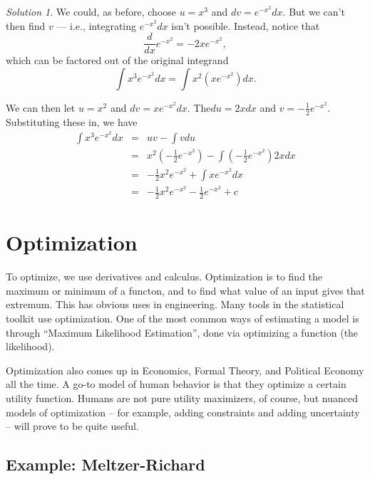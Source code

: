 \documentclass[
]{book}
\theoremstyle{definition}
\theoremstyle{definition}
\theoremstyle{definition}
\theoremstyle{definition}
\theoremstyle{remark}
\newtheorem*{solution}{Solution}
\begin{document}
\begin{solution}
{}We could, as before, choose \(u=x^3\) and \(dv=e^{-x^2}dx\). But we can't then find \(v\) --- i.e., integrating \(e^{-x^2}dx\) isn't possible. Instead, notice that \[\frac{d}{dx}e^{-x^2} = -2xe^{-x^2},\] which can be factored out of the original integrand \[\int x^3 e^{-x^2} dx = \int x^2 (xe^{-x^2})dx.\]

We can then let \(u=x^2\) and \(dv=x e^{-x^2}dx\). The\(du=2x dx\) and \(v=-\frac{1}{2}e^{-x^2}\). Substituting these in, we have
\begin{eqnarray}
                \int x^3 e^{-x^2} dx &=& u v - \int v du\nonumber\\
                &=& x^2 \left( -\frac{1}{2}e^{-x^2}\right) -\int \left(-\frac{1}{2}e^{-x^2}\right)2x dx\nonumber\\
                &=& -\frac{1}{2}x^2 e^{-x^2}+\int x e^{-x^2}dx\nonumber\\
                &=& -\frac{1}{2}x^2 e^{-x^2}-\frac{1}{2}e^{-x^2}+c\nonumber
\end{eqnarray}
\end{solution}

\hypertarget{optim}{%
\chapter{Optimization}\label{optim}}

To optimize, we use derivatives and calculus. Optimization is to find the maximum or minimum of a functon, and to find what value of an input gives that extremum. This has obvious uses in engineering. Many tools in the statistical toolkit use optimization. One of the most common ways of estimating a model is through ``Maximum Likelihood Estimation'', done via optimizing a function (the likelihood).

Optimization also comes up in Economics, Formal Theory, and Political Economy all the time. A go-to model of human behavior is that they optimize a certain utility function. Humans are not pure utility maximizers, of course, but nuanced models of optimization -- for example, adding constraints and adding uncertainty -- will prove to be quite useful.

\hypertarget{example-meltzer-richard}{%
\section*{Example: Meltzer-Richard}\label{example-meltzer-richard}}
\end{document}
